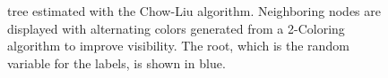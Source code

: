 \begin{figure}[!htb]
{%
    }
        \caption[Approximated independence structure of the Covertype data set]{tree estimated with the Chow-Liu algorithm. Neighboring nodes are displayed with alternating colors generated from a 2-Coloring algorithm to improve visibility. The root, which is the random variable for the labels, is shown in blue.}
        \label{fig:covertype_ind}
\end{figure}